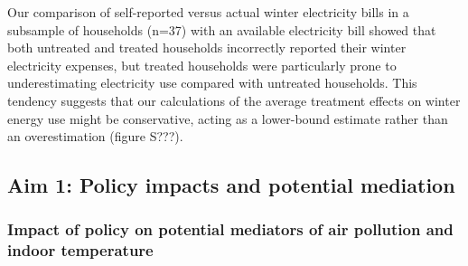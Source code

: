 \documentclass[
  letterpaper,
  DIV=11,
  numbers=noendperiod]{scrartcl}
\begin{document}
Our comparison of self-reported versus actual winter electricity bills
in a subsample of households (n=37) with an available electricity bill
showed that both untreated and treated households incorrectly reported
their winter electricity expenses, but treated households were
particularly prone to underestimating electricity use compared with
untreated households. This tendency suggests that our calculations of
the average treatment effects on winter energy use might be
conservative, acting as a lower-bound estimate rather than an
overestimation (figure S???).

\subsection{Aim 1: Policy impacts and potential
mediation}\label{aim-1-policy-impacts-and-potential-mediation}

\subsubsection{Impact of policy on potential mediators of air pollution
and indoor
temperature}\label{impact-of-policy-on-potential-mediators-of-air-pollution-and-indoor-temperature}
\end{document}
